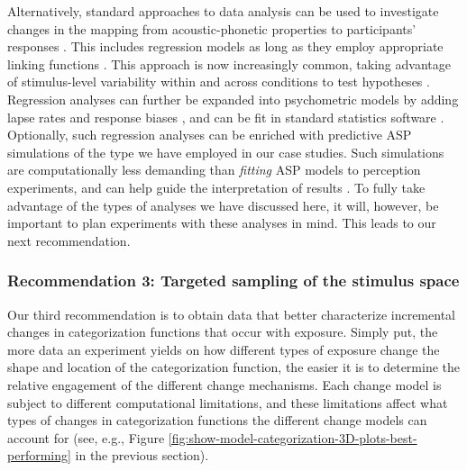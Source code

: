 \documentclass[
  11pt,
  man,floatsintext]{apa6}
\begin{document}
Alternatively, standard approaches to data analysis can be used to investigate changes in the mapping from acoustic-phonetic properties to participants' responses \autocite[for an excellent review, see][]{schertz-clare2020}. This includes regression models as long as they employ appropriate linking functions \autocites[e.g., logistic or multinomial regression for categorization,][]{jaeger2008,winter-wieling2016}. This approach is now increasingly common, taking advantage of stimulus-level variability within and across conditions to test hypotheses \autocites[e.g.,][]{clayards2018,idemaru-holt2020,schertz2015}. Regression analyses can further be expanded into psychometric models \autocite{wichmann-hill2001} by adding lapse rates and response biases \autocites[e.g.,][]{clayards2008,kleinschmidt2020}, and can be fit in standard statistics software \autocite[e.g., \texttt{brms},][]{burkner2017}. Optionally, such regression analyses can be enriched with predictive ASP simulations of the type we have employed in our case studies. Such simulations are computationally less demanding than \emph{fitting} ASP models to perception experiments, and can help guide the interpretation of results \autocites[for examples of approaches that mix predictive simulation with standard data analysis, see][]{bejjanki2011,clayards2008,hitczenko-feldman2016,tan2021,theodore-monto2019,xie2021cognition}[see also discussion in][]{bent-baeseberk2021}. To fully take advantage of the types of analyses we have discussed here, it will, however, be important to plan experiments with these analyses in mind. This leads to our next recommendation.

\subsubsection{Recommendation 3: Targeted sampling of the stimulus space}\label{recommendation-3-targeted-sampling-of-the-stimulus-space}

Our third recommendation is to obtain data that better characterize incremental changes in categorization functions that occur with exposure. Simply put, the more data an experiment yields on how different types of exposure change the shape and location of the categorization function, the easier it is to determine the relative engagement of the different change mechanisms. Each change model is subject to different computational limitations, and these limitations affect what types of changes in categorization functions the different change models can account for (see, e.g., Figure \ref{fig:show-model-categorization-3D-plots-best-performing} in the previous section).
\end{document}
